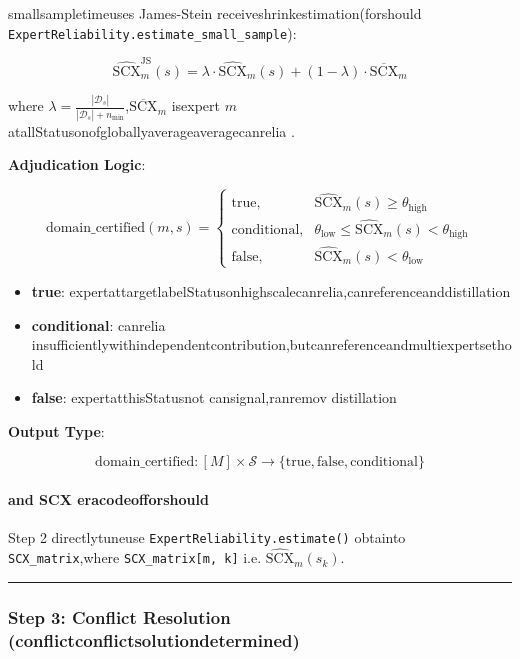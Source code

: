 \documentclass[
  12pt,
]{article}
\providecommand{\tightlist}{%
  \setlength{\itemsep}{0pt}\setlength{\parskip}{0pt}}
\begin{document}
smallsampletimeuses James-Stein receiveshrinkestimation(forshould
\texttt{ExpertReliability.estimate\_small\_sample}):

\[\widehat{\text{SCX}}_m^{\text{JS}}(s) = \lambda \cdot \widehat{\text{SCX}}_m(s) + (1 - \lambda) \cdot \overline{\text{SCX}}_m\]

where
\(\lambda = \frac{|\mathcal{D}_{s}|}{|\mathcal{D}_{s}| + n_{\min}}\),\(\overline{\text{SCX}}_m\)
isexpert \(m\) atallStatusonofgloballyaverageaveragecanrelia .

\textbf{Adjudication Logic}:

\[\text{domain\_certified}(m, s) = \begin{cases}
\text{true}, & \widehat{\text{SCX}}_m(s) \ge \theta_{\text{high}} \\[0.5em]
\text{conditional}, & \theta_{\text{low}} \le \widehat{\text{SCX}}_m(s) < \theta_{\text{high}} \\[0.5em]
\text{false}, & \widehat{\text{SCX}}_m(s) < \theta_{\text{low}}
\end{cases}\]

\begin{itemize}
\tightlist
\item
  \textbf{true}: expertattargetlabelStatusonhighscalecanrelia,canreferenceanddistillation
\item
  \textbf{conditional}: canrelia insufficientlywithindependentcontribution,butcanreferenceandmultiexpertsethold
\item
  \textbf{false}: expertatthisStatusnot cansignal,ranremov distillation
\end{itemize}

\textbf{Output Type}:

\[\text{domain\_certified}: [M] \times \mathcal{S} \to \{\text{true}, \text{false}, \text{conditional}\}\]

\paragraph{and SCX
eracodeofforshould}\label{ux4e0e-scx-ux4ee3ux7801ux7684ux5bf9ux5e94}

Step 2 directlytuneuse \texttt{ExpertReliability.estimate()} obtainto 
\texttt{SCX\_matrix},where \texttt{SCX\_matrix{[}m,\ k{]}} i.e.
\(\widehat{\text{SCX}}_m(s_k)\).

\begin{center}\rule{0.5\linewidth}{0.5pt}\end{center}

\subsubsection{Step 3: Conflict Resolution
(conflictconflictsolutiondetermined)}\label{step-3-conflict-resolution-ux51b2ux7a81ux89e3ux51b3}
\end{document}

